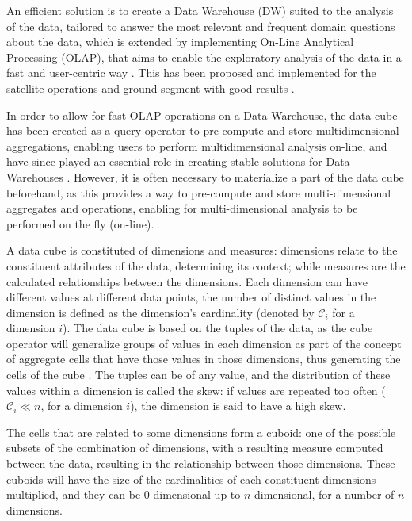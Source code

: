 An efficient solution is to create a Data Warehouse (DW) suited to the analysis of the data, tailored to answer the most relevant and frequent domain questions about the data, which is extended by implementing On-Line Analytical Processing (OLAP), that aims to enable the exploratory analysis of the data in a fast and user-centric way \cite{hanDataMiningConcepts2011,viswanathanUsercentricSpatialData2014}.
This has been proposed and implemented for the satellite operations and ground segment with good results \cite{adamskiDataAnalyticsLarge2016,yvernesCopernicusGroundSegment2018}.

In order to allow for fast OLAP operations on a Data Warehouse, the data cube has been created as a query operator to pre-compute and store multidimensional aggregations, enabling users to perform multidimensional analysis on-line, and have since played an essential role in creating stable solutions for Data Warehouses \cite{grayDataCubeRelational1996}.
However, it is often necessary to materialize a part of the data cube beforehand, as this provides a way to pre-compute and store multi-dimensional aggregates and operations, enabling for multi-dimensional analysis to be performed on the fly (on-line).

A data cube is constituted of dimensions and measures: dimensions relate to the constituent attributes of the data, determining its context; while measures are the calculated relationships between the dimensions.
Each dimension can have different values at different data points, the number of distinct values in the dimension is defined as the dimension's cardinality (denoted by \(\mathcal{C}_i\) for a dimension \(i\)).
The data cube is based on the tuples of the data, as the cube operator will generalize groups of values in each dimension as part of the concept of aggregate cells that have those values in those dimensions, thus generating the cells of the cube \cite{hanDataMiningConcepts2011}.
The tuples can be of any value, and the distribution of these values within a dimension is called the skew: if values are repeated too often (\(\mathcal{C}_i \ll n\), for a dimension \(i\)), the dimension is said to have a high skew.

The cells that are related to some dimensions form a cuboid: one of the possible subsets of the combination of dimensions, with a resulting measure computed between the data, resulting in the relationship between those dimensions.
These cuboids will have the size of the cardinalities of each constituent dimensions multiplied, and they can be 0-dimensional up to \(n\)-dimensional, for a number of \(n\) dimensions.

